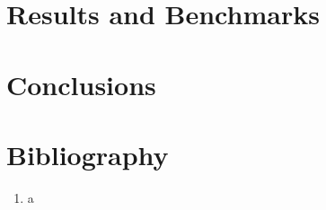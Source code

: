 \documentclass[12pt]{article}
\numberwithin{equation}{section}
\begin{document}
\section{Results and Benchmarks}
\label{sec:results}



\section{Conclusions}
\label{sec:conclusions}



\section{Bibliography}
\label{sec:bib}

\begin{enumerate}

\item a

\end{enumerate}
\end{document}
